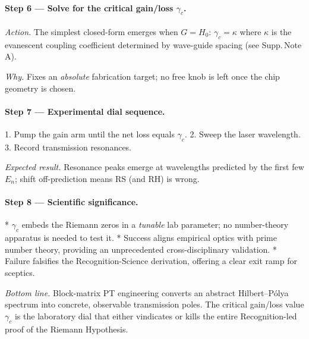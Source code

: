 \documentclass[11pt]{article}
\begin{document}
\vspace{0.4em}
\paragraph{Step 6 — Solve for the critical gain/loss \(\gamma_{c}\).}

\emph{Action.}  
The simplest closed-form emerges when \(G=H_{0}\):
\(
   \gamma_{c}=\kappa
\)
where \(\kappa\) is the evanescent coupling coefficient determined by
wave-guide spacing (see Supp.\,Note A).

\emph{Why.}  
Fixes an \emph{absolute} fabrication target; no free knob is left once
the chip geometry is chosen.

\vspace{0.4em}
\paragraph{Step 7 — Experimental dial sequence.}

1.  Pump the gain arm until the net loss equals \(\gamma_{c}\).  
2.  Sweep the laser wavelength.  
3.  Record transmission resonances.

\emph{Expected result.}  
Resonance peaks emerge at wavelengths predicted by the first few
\(E_{n}\); shift off-prediction means RS (and RH) is wrong.

\vspace{0.4em}
\paragraph{Step 8 — Scientific significance.}

* \(\gamma_{c}\) embeds the Riemann zeros in a \emph{tunable} lab
  parameter; no number-theory apparatus is needed to test it.  
* Success aligns empirical optics with prime number theory, providing
  an unprecedented cross-disciplinary validation.  
* Failure falsifies the Recognition-Science derivation, offering a
  clear exit ramp for sceptics.

\bigskip
\noindent
\emph{Bottom line.}\;  
Block-matrix PT engineering converts an abstract Hilbert–Pólya
spectrum into concrete, observable transmission poles.  
The critical gain/loss value \(\gamma_{c}\) is the
laboratory dial that either vindicates or kills the entire
Recognition-led proof of the Riemann Hypothesis.
\end{document}
